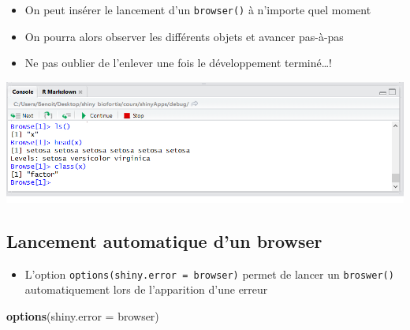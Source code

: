 \documentclass[
]{article}
\newenvironment{Shaded}{\begin{snugshade}}{\end{snugshade}}
\newcommand{\AttributeTok}[1]{\textcolor[rgb]{0.13,0.29,0.53}{#1}}
\newcommand{\CommentTok}[1]{\textcolor[rgb]{0.56,0.35,0.01}{\textit{#1}}}
\newcommand{\FunctionTok}[1]{\textcolor[rgb]{0.13,0.29,0.53}{\textbf{#1}}}
\newcommand{\NormalTok}[1]{#1}
\newcommand{\OtherTok}[1]{\textcolor[rgb]{0.56,0.35,0.01}{#1}}
\newcommand{\SpecialCharTok}[1]{\textcolor[rgb]{0.81,0.36,0.00}{\textbf{#1}}}
\providecommand{\tightlist}{%
  \setlength{\itemsep}{0pt}\setlength{\parskip}{0pt}}
\begin{document}
\begin{itemize}
\tightlist
\item
  On peut insérer le lancement d'un \texttt{browser()} à n'importe quel
  moment
\item
  On pourra alors observer les différents objets et avancer pas-à-pas
\end{itemize}

\begin{Shaded}
\end{Shaded}

\begin{itemize}
\tightlist
\item
  Ne pas oublier de l'enlever une fois le développement terminé\ldots!
\end{itemize}

\includegraphics{img/debug_browser.png}

\hypertarget{lancement-automatique-dun-browser}{%
\subsection{Lancement automatique d'un
browser}\label{lancement-automatique-dun-browser}}

\begin{itemize}
\tightlist
\item
  L'option \texttt{options(shiny.error\ =\ browser)} permet de lancer un
  \texttt{broswer()} automatiquement lors de l'apparition d'une erreur
\end{itemize}

\begin{Shaded}
\begin{Highlighting}[]
\FunctionTok{options}\NormalTok{(}\AttributeTok{shiny.error =}\NormalTok{ browser)}
\end{Highlighting}
\end{Shaded}
\end{document}
